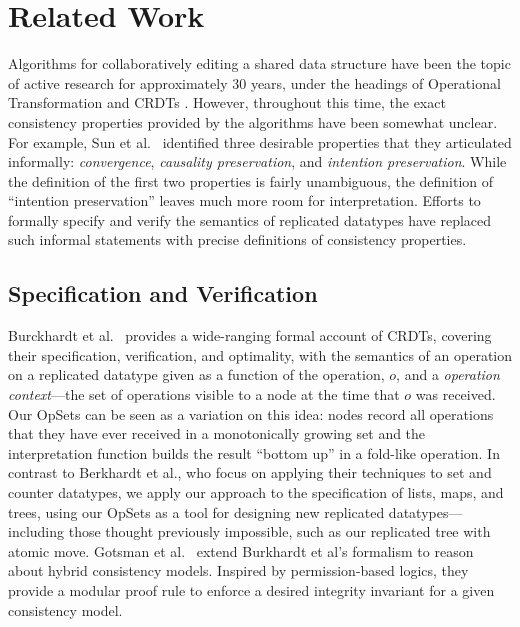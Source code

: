 \section{Related Work}\label{sec:relwork}

Algorithms for collaboratively editing a shared data structure have been the topic of active research for approximately 30 years, under the headings of Operational Transformation \cite{Ellis:1989ue,Ressel:1996wx,Sun:1998vf,Oster:2006tr} and CRDTs \cite{Shapiro:2011wy,Shapiro:2011un}.
However, throughout this time, the exact consistency properties provided by the algorithms have been somewhat unclear.
For example, Sun et al.~\cite{Sun:1998un} identified three desirable properties that they articulated informally: \emph{convergence}, \emph{causality preservation}, and \emph{intention preservation}.
While the definition of the first two properties is fairly unambiguous, the definition of ``intention preservation'' leaves much more room for interpretation.
Efforts to formally specify and verify the semantics of replicated datatypes have replaced such informal statements with precise definitions of consistency properties.

\subsection{Specification and Verification}

Burckhardt et al.~\cite{Burckhardt:2014ft} provides a wide-ranging formal account of CRDTs, covering their specification, verification, and optimality, with the semantics of an operation on a replicated datatype given as a function of the operation, $o$, and a \emph{operation context}---the set of operations visible to a node at the time that $o$ was received.
Our OpSets can be seen as a variation on this idea: nodes record all operations that they have ever received in a monotonically growing set and the interpretation function builds the result ``bottom up'' in a fold-like operation.
In contrast to Berkhardt et al., who focus on applying their techniques to set and counter datatypes, we apply our approach to the specification of lists, maps, and trees, using our OpSets as a tool for designing new replicated datatypes---including those thought previously impossible, such as our replicated tree with atomic move.
Gotsman et al.~\cite{DBLP:conf/popl/GotsmanYFNS16} extend Burkhardt et al's formalism to reason about hybrid consistency models.
Inspired by permission-based logics, they provide a modular proof rule to enforce a desired integrity invariant for a given consistency model.

